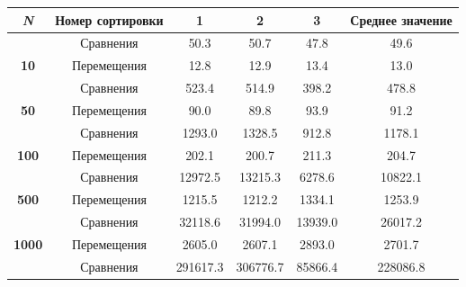 \documentclass[a4paper,11pt]{article}
\begin{document}
    \begin{table}[H]
        \begin{tabular}{|c|c|c|c|c|c|}
        \hline
        \textit{\textbf{N}}                                     & \textbf{Номер сортировки} & \textbf{1} & \textbf{2} & \textbf{3} & \textbf{Среднее значение} \\ \hline
        {\color[HTML]{3F3B42} }                                 & Сравнения                 & 50.3       & 50.7       & 47.8       & 49.6                      \\ \cline{2-6} 
        \multirow{-2}{*}{{\color[HTML]{3F3B42} \textbf{10}}}    & Перемещения               & 12.8       & 12.9       & 13.4       & 13.0                      \\ \hline
        {\color[HTML]{3F3B42} }                                 & Сравнения                 & 523.4      & 514.9      & 398.2      & 478.8                     \\ \cline{2-6} 
        \multirow{-2}{*}{{\color[HTML]{3F3B42} \textbf{50}}}    & Перемещения               & 90.0       & 89.8       & 93.9       & 91.2                      \\ \hline
        {\color[HTML]{3F3B42} }                                 & Сравнения                 & 1293.0     & 1328.5     & 912.8      & 1178.1                    \\ \cline{2-6} 
        \multirow{-2}{*}{{\color[HTML]{3F3B42} \textbf{100}}}   & Перемещения               & 202.1      & 200.7      & 211.3      & 204.7                     \\ \hline
        {\color[HTML]{3F3B42} }                                 & Сравнения                 & 12972.5    & 13215.3    & 6278.6     & 10822.1                   \\ \cline{2-6} 
        \multirow{-2}{*}{{\color[HTML]{3F3B42} \textbf{500}}}   & Перемещения               & 1215.5     & 1212.2     & 1334.1     & 1253.9                    \\ \hline
        {\color[HTML]{3F3B42} }                                 & Сравнения                 & 32118.6    & 31994.0    & 13939.0    & 26017.2                   \\ \cline{2-6} 
        \multirow{-2}{*}{{\color[HTML]{3F3B42} \textbf{1000}}}  & Перемещения               & 2605.0     & 2607.1     & 2893.0     & 2701.7                    \\ \hline
        {\color[HTML]{3F3B42} }                                 & Сравнения                 & 291617.3   & 306776.7   & 85866.4    & 228086.8                  \\ \cline{2-6} 

\end{tabular}
\end{table}
\end{document}
